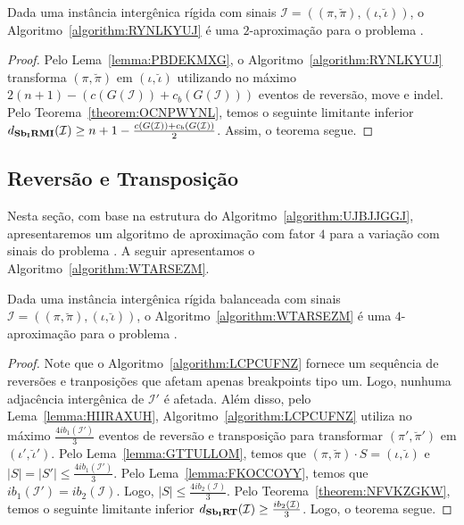 \begin{theorem}\label{theorem:ICVGEGVZ}
Dada uma instância intergênica rígida com sinais $\mathcal{I}=((\pi,\breve\pi),(\iota,\breve\iota))$, o Algoritmo~\ref{algorithm:RYNLKYUJ} é uma $2$-aproximação para o problema \SbIRMI{}.
\end{theorem}
\begin{proof}
Pelo Lema~\ref{lemma:PBDEKMXG}, o Algoritmo~\ref{algorithm:RYNLKYUJ} transforma $(\pi,\breve\pi)$ em $(\iota,\breve\iota)$ utilizando no máximo $2(n + 1) - (c(G(\mathcal{I})) + c_b(G(\mathcal{I})))$ eventos de reversão, move e indel. Pelo Teorema~\ref{theorem:OCNPWYNL}, temos o seguinte limitante inferior $d_{\textbf{Sb\textsubscript{I}RMI}}(\mathcal{I}) \ge {n + 1} - \frac{c(G(\mathcal{I})) + c_b(G(\mathcal{I}))}{2}$. Assim, o teorema segue.
\end{proof}

\subsection{Reversão e Transposição}

Nesta seção, com base na estrutura do Algoritmo~\ref{algorithm:UJBJJGGJ}, apresentaremos um algoritmo de aproximação com fator $4$ para a variação com sinais do problema \SbIRT{}. A seguir apresentamos o Algoritmo~\ref{algorithm:WTARSEZM}.



\begin{theorem}\label{theorem:TRRZCTJT}
Dada uma instância intergênica rígida balanceada com sinais $\mathcal{I}=((\pi,\breve\pi),(\iota,\breve\iota))$, o Algoritmo~\ref{algorithm:WTARSEZM} é uma $4$-aproximação para o problema \SbIRT{}.
\end{theorem}
\begin{proof}
Note que o Algoritmo~\ref{algorithm:LCPCUFNZ} fornece um sequência de reversões e tranposições que afetam apenas breakpoints tipo um. Logo, nunhuma adjacência intergênica de $\mathcal{I'}$ é afetada. Além disso, pelo Lema~\ref{lemma:HIIRAXUH}, Algoritmo~\ref{algorithm:LCPCUFNZ} utiliza no máximo $\frac{4ib_1(\mathcal{I'})}{3}$ eventos de reversão e transposição para transformar $(\pi',\breve\pi')$ em $(\iota',\breve\iota')$. Pelo Lema~\ref{lemma:GTTULLOM}, temos que $(\pi,\breve\pi) \cdot S = (\iota,\breve\iota)$ e $|S| = |S'| \le \frac{4ib_1(\mathcal{I'})}{3}$. Pelo Lema~\ref{lemma:FKOCCOYY}, temos que $ib_1(\mathcal{I'}) = ib_2(\mathcal{I})$. Logo, $|S| \le \frac{4ib_2(\mathcal{I})}{3}$. Pelo Teorema~\ref{theorem:NFVKZGKW}, temos o seguinte limitante inferior $d_{\textbf{Sb\textsubscript{I}RT}}(\mathcal{I}) \ge \frac{ib_2(\mathcal{I})}{3}$. Logo, o teorema segue.
\end{proof}

